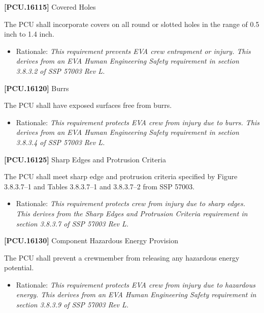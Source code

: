 \documentclass[12pt,oneside,oldfontcommands]{memoir}
\begin{document}
\textbf{[PCU.16115]} Covered Holes

The \gls{PCU} shall incorporate covers on all round or slotted holes in the range of 0.5 inch to 1.4 inch.

\begin{itemize}
\item{} Rationale: \emph{This requirement prevents EVA crew entrapment or injury. This derives from an EVA Human Engineering Safety requirement in section 3.8.3.2 of SSP 57003 Rev L.}

\end{itemize}

\textbf{[PCU.16120]} Burrs

The \gls{PCU} shall have exposed surfaces free from burrs.

\begin{itemize}
\item{} Rationale: \emph{This requirement protects EVA crew from injury due to burrs. This derives from an EVA Human Engineering Safety requirement in section 3.8.3.4 of SSP 57003 Rev L.}

\end{itemize}

\textbf{[PCU.16125]} Sharp Edges and Protrusion Criteria

The \gls{PCU} shall meet sharp edge and protrusion criteria specified by Figure 3.8.3.7--1 and Tables 3.8.3.7--1 and 3.8.3.7--2 from SSP 57003.

\begin{itemize}
\item{} Rationale: \emph{This requirement protects crew from injury due to sharp edges. This derives from the Sharp Edges and Protrusion Criteria requirement in section 3.8.3.7 of SSP 57003 Rev L.}

\end{itemize}

\textbf{[PCU.16130]} Component Hazardous Energy Provision

The \gls{PCU} shall prevent a crewmember from releasing any hazardous energy potential.

\begin{itemize}
\item{} Rationale: \emph{This requirement protects EVA crew from injury due to hazardous energy. This derives from an EVA Human Engineering Safety requirement in section 3.8.3.9 of SSP 57003 Rev L.}

\end{itemize}
\end{document}
